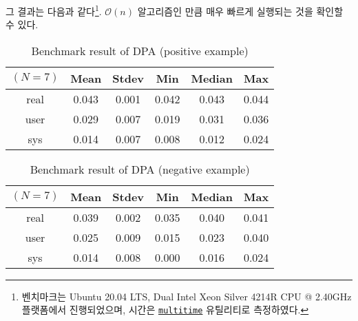 \documentclass[a4paper,10pt]{scrartcl}
\numberwithin{equation}{section}
\numberwithin{figure}{section}
\numberwithin{table}{section}
\theoremstyle{definition}
\begin{document}
그 결과는 다음과 같다\footnote{벤치마크는 Ubuntu 20.04 LTS, Dual Intel\textsuperscript{\tiny\textregistered} Xeon\textsuperscript{\tiny\textregistered} Silver 4214R CPU @ 2.40GHz 플랫폼에서 진행되었으며, 시간은 \href{https://tratt.net/laurie/src/multitime/}{\texttt{multitime}} 유틸리티로 측정하였다.}. $\mathcal{O}(n)$ 알고리즘인 만큼 매우 빠르게 실행되는 것을 확인할 수 있다.
\begin{table}[H]
  \centering
  \caption{Benchmark result of DPA (positive example)}
  \begin{tabular}{ c c c c c c }
    \toprule
    $(N=7)$ & Mean  & Stdev & Min   & Median & Max   \\
    \midrule
    real    & 0.043 & 0.001 & 0.042 & 0.043  & 0.044 \\
    user    & 0.029 & 0.007 & 0.019 & 0.031  & 0.036 \\
    sys     & 0.014 & 0.007 & 0.008 & 0.012  & 0.024 \\
    \bottomrule
  \end{tabular}
\end{table}
\begin{table}[H]
  \centering
  \caption{Benchmark result of DPA (negative example)}
  \begin{tabular}{ c c c c c c }
    \toprule
    $(N=7)$ & Mean  & Stdev & Min   & Median & Max   \\
    \midrule
    real    & 0.039 & 0.002 & 0.035 & 0.040  & 0.041 \\
    user    & 0.025 & 0.009 & 0.015 & 0.023  & 0.040 \\
    sys     & 0.014 & 0.008 & 0.000 & 0.016  & 0.024 \\
    \bottomrule
  \end{tabular}
\end{table}
\end{document}
